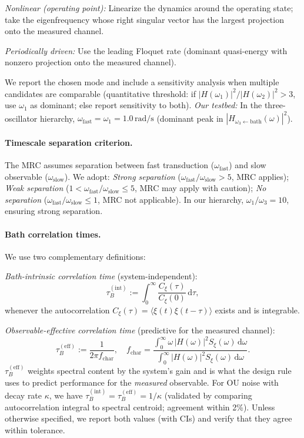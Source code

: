 \documentclass[11pt,letterpaper]{article}
\begin{document}
\emph{Nonlinear (operating point):} Linearize the dynamics around the operating state; take the eigenfrequency whose right singular vector has the largest projection onto the measured channel.

\emph{Periodically driven:} Use the leading Floquet rate (dominant quasi-energy with nonzero projection onto the measured channel).

We report the chosen mode and include a sensitivity analysis when multiple candidates are comparable (quantitative threshold: if $|H(\omega_1)|^2 / |H(\omega_2)|^2 > 3$, use $\omega_1$ as dominant; else report sensitivity to both). \emph{Our testbed:} In the three-oscillator hierarchy, $\omega_{\mathrm{fast}}=\omega_1=1.0\,\mathrm{rad/s}$ (dominant peak in $|H_{\omega_3\leftarrow\mathrm{bath}}(\omega)|^2$).

\paragraph*{Timescale separation criterion.}
The MRC assumes separation between fast transduction ($\omega_{\mathrm{fast}}$) and slow observable ($\omega_{\mathrm{slow}}$). We adopt: \emph{Strong separation} ($\omega_{\mathrm{fast}}/\omega_{\mathrm{slow}} > 5$, MRC applies); \emph{Weak separation} ($1 < \omega_{\mathrm{fast}}/\omega_{\mathrm{slow}} \le 5$, MRC may apply with caution); \emph{No separation} ($\omega_{\mathrm{fast}}/\omega_{\mathrm{slow}} \le 1$, MRC not applicable). In our hierarchy, $\omega_1/\omega_3 = 10$, ensuring strong separation.

\paragraph*{Bath correlation times.}
We use two complementary definitions:

\emph{Bath-intrinsic correlation time} (system-independent):
\[
\tau_B^{(\mathrm{int})} := \int_0^\infty \frac{C_\xi(\tau)}{C_\xi(0)}\,\mathrm{d}\tau,
\]
whenever the autocorrelation $C_\xi(\tau)=\langle\xi(t)\xi(t-\tau)\rangle$ exists and is integrable.

\emph{Observable-effective correlation time} (predictive for the measured channel):
\[
\tau_B^{(\mathrm{eff})} := \frac{1}{2\pi f_{\mathrm{char}}},\quad
f_{\mathrm{char}} = \frac{\int_0^\infty \omega\, |H(\omega)|^2 S_\xi(\omega)\,\mathrm{d}\omega}
{\int_0^\infty |H(\omega)|^2 S_\xi(\omega)\,\mathrm{d}\omega}.
\]
$\tau_B^{(\mathrm{eff})}$ weights spectral content by the system's gain and is what the design rule uses to predict performance for the \emph{measured} observable. For OU noise with decay rate $\kappa$, we have $\tau_B^{(\mathrm{int})}=\tau_B^{(\mathrm{eff})}=1/\kappa$ (validated by comparing autocorrelation integral to spectral centroid; agreement within 2\%). Unless otherwise specified, we report both values (with CIs) and verify that they agree within tolerance.
\end{document}
